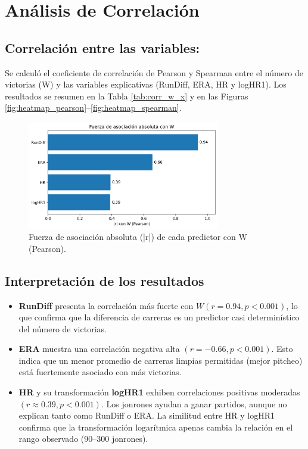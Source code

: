 \documentclass[10pt]{article}
\begin{document}
\section{Análisis de Correlación}
\subsection{Correlación entre las variables:}

Se calculó el coeficiente de correlación de Pearson y Spearman entre el número de victorias (W) y las variables explicativas 
(RunDiff, ERA, HR y logHR1). Los resultados se resumen en la Tabla \ref{tab:corr_w_x} y en las Figuras 
\ref{fig:heatmap_pearson}--\ref{fig:heatmap_spearman}.



\begin{figure}[H]
    \centering
    \includegraphics[width=0.75\textwidth]{../plots/bar_abs_r_W.png}
    \caption{Fuerza de asociación absoluta (|r|) de cada predictor con W (Pearson).}
    \label{fig:bar_abs_r}
\end{figure}

\subsection{Interpretación de los resultados}

\begin{itemize}
    \item \textbf{RunDiff} presenta la correlación más fuerte con $W (r = 0.94, p < 0.001)$, lo que confirma que la diferencia de carreras es un predictor casi determinístico del número de victorias.
    \item \textbf{ERA} muestra una correlación negativa alta $(r = -0.66, p < 0.001)$. Esto indica que un menor promedio de carreras limpias permitidas (mejor pitcheo) está fuertemente asociado con más victorias.
    \item \textbf{HR} y su transformación \textbf{logHR1} exhiben correlaciones positivas moderadas $(r \approx 0.39, p < 0.001)$. Los jonrones ayudan a ganar partidos, aunque no explican tanto como RunDiff o ERA. La similitud entre HR y logHR1 confirma que la transformación logarítmica apenas cambia la relación en el rango observado (90--300 jonrones).
\end{itemize}
\end{document}
